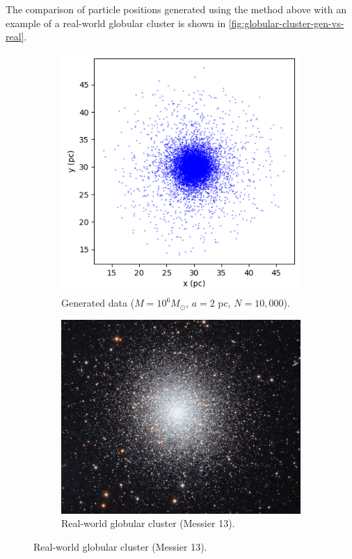 The comparison of particle positions generated using the method above with an example of a real-world globular cluster is shown in \autoref{fig:globular-cluster-gen-vs-real}.
\begin{figure}[htp]
    \centering
    \begin{subfigure}[b]{0.4\textwidth}
        \centering
        \includegraphics[width=\textwidth]{chapters/test-models/img/globular_generated.png}
        \caption{Generated data ($M=10^{6} M_\odot$, $a=2$ pc, $N=10,000$).}
        \label{fig:glob-cluster-model-generated}
    \end{subfigure}
    \hfill
    \begin{subfigure}[b]{0.4\textwidth}
        \centering
        \includegraphics[width=\textwidth]{chapters/test-models/img/glob_cluster_m13.jpg}
        \caption{Real-world globular cluster (Messier 13).}
        \label{fig:messier-13}
    \end{subfigure}


\end{figure}
